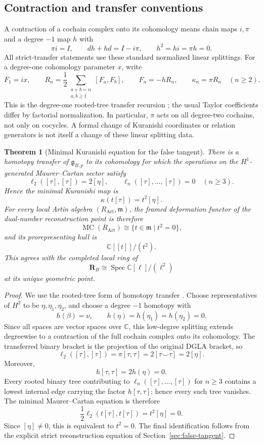\documentclass[11pt]{amsart}
\newtheorem{theorem}{Theorem}[section]
\newcommand{\Spec}{\operatorname{Spec}}
\newcommand{\C}{\mathbb C}
\newcommand{\MC}{\operatorname{MC}}
\newcommand{\ghoch}{\mathfrak g}
\begin{document}
\subsection{Contraction and transfer conventions}\label{subsec:transfer-convention}
A contraction of a cochain complex onto its cohomology means chain maps
$i,\pi$ and a degree $-1$ map $h$ with
\[
\pi i=I,\qquad dh+hd=I-i\pi,\qquad h^2=hi=\pi h=0.
\]
All strict-transfer statements use these standard normalized linear
splittings. For a degree-one cohomology parameter $x$, write
\[
F_1=ix,\qquad
R_n=\frac12\sum_{\substack{a+b=n\\a,b\ge1}}[F_a,F_b],
\qquad F_n=-hR_n,\qquad \kappa_n=\pi R_n\quad(n\ge2).
\]
This is the degree-one rooted-tree transfer recursion
\cite[Chapter~10]{LodayVallette2012}; the usual Taylor coefficients differ
by factorial normalization. In particular, $\pi$ acts on all degree-two
cochains, not only on cocycles. A formal change of Kuranishi coordinates
or relation generators is not itself a change of these linear splitting data.

\begin{theorem}[Minimal Kuranishi equation for the false tangent]\label{thm:dual-minimal-kuranishi}
There is a homotopy transfer of $\ghoch_{B,p}$ to its cohomology for which the operations on the $H^1$-generated Maurer--Cartan sector satisfy
\[
\ell_2([\tau],[\tau])=2[\eta],
\qquad
\ell_n([\tau],\ldots,[\tau])=0
\quad(n\ge3).
\]
Hence the minimal Kuranishi map is
\[
\kappa(t[\tau])=t^2[\eta].
\]
For every local Artin algebra $(R_{\mathrm{Art}},\mathfrak m)$, the framed deformation functor of the dual-number reconstruction point is therefore
\[
\MC(R_{\mathrm{Art}})
\cong
\{t\in\mathfrak m\mid t^2=0\},
\]
and its prorepresenting hull is
\[
\boxed{
\C[[t]]/(t^2).
}
\]
This agrees with the completed local ring of
\[
\mathbf R_B\cong\Spec\C[\ell]/(\ell^2)
\]
at its unique geometric point.
\end{theorem}

\begin{proof}
We use the rooted-tree form of homotopy transfer
\cite[Chapter~10]{LodayVallette2012}. Choose representatives of $H^2$ to be
$\eta,\eta_1,\eta_2$, and choose a degree $-1$ homotopy with
\[
h(\beta)=\nu,
\qquad
h(\eta)=h(\eta_1)=h(\eta_2)=0.
\]
Since all spaces are vector spaces over $\C$, this low-degree splitting extends degreewise to a contraction of the full cochain complex onto its cohomology.  The transferred binary bracket is the projection of the original DGLA bracket, so
\[
\ell_2([\tau],[\tau])
=\pi[\tau,\tau]
=2[\tau\smile\tau]
=2[\eta].
\]
Moreover,
\[
h[\tau,\tau]=2h(\eta)=0.
\]
Every rooted binary tree contributing to $\ell_n([\tau],\ldots,[\tau])$ for $n\ge3$ contains a lowest internal edge carrying the factor $h[\tau,\tau]$; hence every such tree vanishes.  The minimal Maurer--Cartan equation is therefore
\[
\frac12\ell_2(t[\tau],t[\tau])=t^2[\eta]=0.
\]
Since $[\eta]\neq0$, this is equivalent to $t^2=0$.  The final identification follows from the explicit strict reconstruction equation of Section~\ref{sec:false-tangent}.
\end{proof}
\end{document}
